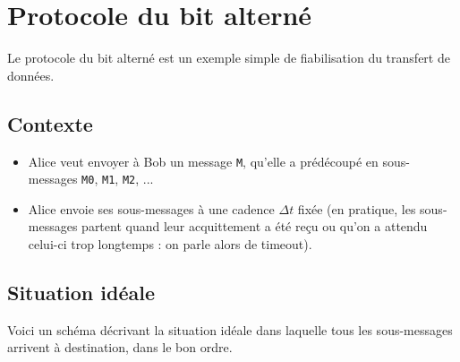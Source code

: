 \documentclass[a4paper,dvipsnames]{article}
\begin{document}
\section{Protocole du bit alterné}

Le protocole du bit alterné est un exemple simple de fiabilisation du transfert de données.

\subsection{Contexte}

\begin{itemize}
  \item Alice veut envoyer à Bob un message \texttt{M}, qu'elle a prédécoupé en sous-messages \texttt{M0}, \texttt{M1}, \texttt{M2}, ...
  \item Alice envoie ses sous-messages à une cadence $\Delta t$ fixée (en pratique, les sous-messages partent quand leur acquittement a été reçu ou qu'on a attendu celui-ci trop longtemps : on parle alors de timeout).
\end{itemize}

\subsection{Situation idéale}

Voici un schéma décrivant la situation idéale dans laquelle tous les sous-messages arrivent à destination, dans le bon ordre.

\begin{center}
\end{center}
\end{document}
